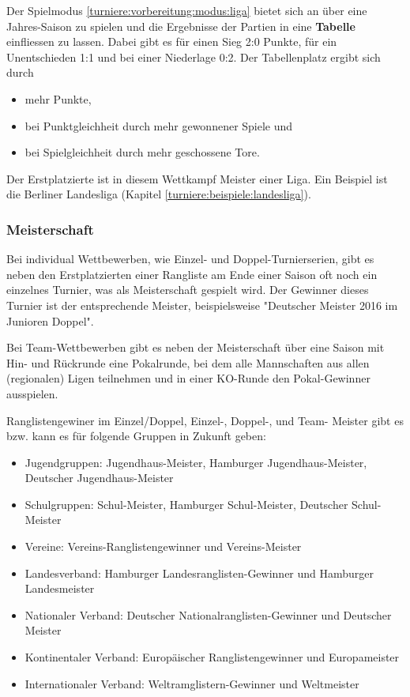 Der Spielmodus \ref{turniere:vorbereitung:modus:liga} bietet sich an über eine Jahres-Saison zu spielen und die Ergebnisse der Partien in eine \textbf{Tabelle} einfliessen zu lassen. Dabei gibt es für einen Sieg 2:0 Punkte, für ein Unentschieden 1:1 und bei einer Niederlage 0:2. Der Tabellenplatz ergibt sich durch  
\begin{itemize}
\item mehr Punkte,
\item bei Punktgleichheit durch mehr gewonnener Spiele und
\item bei Spielgleichheit durch mehr geschossene Tore.
\end{itemize}
Der Erstplatzierte ist in diesem Wettkampf Meister einer Liga. Ein Beispiel ist die Berliner Landesliga (Kapitel \ref{turniere:beispiele:landesliga}). 

\subsubsection{Meisterschaft}
\label{turniere:ergebnisse:rahmen:meisterschaft}

Bei individual Wettbewerben, wie Einzel- und Doppel-Turnierserien, gibt es neben den Erstplatzierten einer Rangliste am Ende einer Saison oft noch ein einzelnes Turnier, was als Meisterschaft gespielt wird. 
Der Gewinner dieses Turnier ist der entsprechende Meister, beispielsweise "Deutscher Meister 2016 im Junioren Doppel".

Bei Team-Wettbewerben gibt es neben der Meisterschaft über eine Saison mit Hin- und Rückrunde eine Pokalrunde, bei dem alle Mannschaften aus allen (regionalen) Ligen teilnehmen und in einer KO-Runde den Pokal-Gewinner ausspielen.

Ranglistengewiner im Einzel/Doppel, Einzel-, Doppel-, und Team- Meister gibt es bzw. kann es für folgende Gruppen in Zukunft geben: 
\begin{itemize}
\item Jugendgruppen: Jugendhaus-Meister, Hamburger Jugendhaus-Meister, Deutscher Jugendhaus-Meister
\item Schulgruppen: Schul-Meister, Hamburger Schul-Meister, Deutscher Schul-Meister
\item Vereine: Vereins-Ranglistengewinner und Vereins-Meister
\item Landesverband: Hamburger Landesranglisten-Gewinner und Hamburger Landesmeister
\item Nationaler Verband: Deutscher Nationalranglisten-Gewinner und Deutscher Meister
\item Kontinentaler Verband: Europäischer Ranglistengewinner und Europameister
\item Internationaler Verband: Weltramglistern-Gewinner und Weltmeister
\end{itemize}


